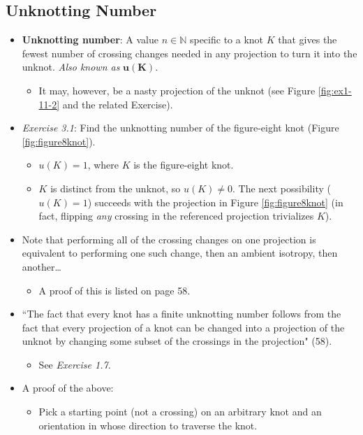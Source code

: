 \documentclass[titlepage]{article}
\numberwithin{figure}{section}
\numberwithin{table}{section}
\numberwithin{equation}{section}
\newcommand{\dq}[2]{``#1" (#2).}
\begin{document}
\subsection{Unknotting Number}\label{sss:UnknottingNumber}
\begin{itemize}
    \item \textbf{Unknotting number}: A value $n\in\mathbb{N}$ specific to a knot $K$ that gives the fewest number of crossing changes needed in any projection to turn it into the unknot. \emph{Also known as} $\mathbf{u(K)}$.
    \begin{itemize}
        \item It may, however, be a nasty projection of the unknot (see Figure \ref{fig:ex1-11-2} and the related Exercise).
    \end{itemize}
    \item \emph{Exercise 3.1}: Find the unknotting number of the figure-eight knot (Figure \ref{fig:figure8knot}).
    \begin{itemize}
        \item $u(K)=1$, where $K$ is the figure-eight knot.
        \item $K$ is distinct from the unknot, so $u(K)\neq 0$. The next possibility ($u(K)=1$) succeeds with the projection in Figure \ref{fig:figure8knot} (in fact, flipping \emph{any} crossing in the referenced projection trivializes $K$).
    \end{itemize}
    \item Note that performing all of the crossing changes on one projection is equivalent to performing one such change, then an ambient isotropy, then another\dots
    \begin{itemize}
        \item A proof of this is listed on page 58.
    \end{itemize}
    \item \dq{The fact that every knot has a finite unknotting number follows from the fact that every projection of a knot can be changed into a projection of the unknot by changing some subset of the crossings in the projection}{58}
    \begin{itemize}
        \item See \emph{Exercise 1.7}.
    \end{itemize}
    \item A proof of the above:
    \begin{itemize}
        \item Pick a starting point (not a crossing) on an arbitrary knot and an orientation in whose direction to traverse the knot.

\end{itemize}
\end{itemize}
\end{document}
